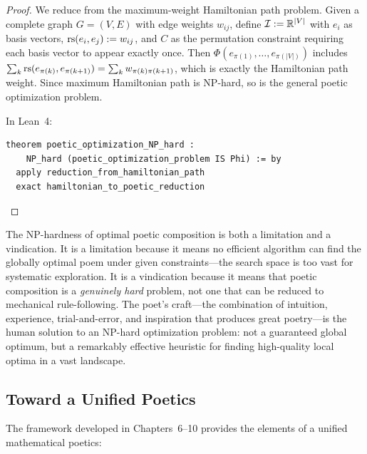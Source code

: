 \begin{proof}
We reduce from the maximum-weight Hamiltonian path problem.  Given a
complete graph $G = (V, E)$ with edge weights $w_{ij}$, define
$\mathcal{I} := \mathbb{R}^{|V|}$ with $e_i$ as basis vectors, $\mathrm{rs}(e_i, e_j) := w_{ij}$,
and $C$ as the permutation constraint requiring each basis vector to appear
exactly once.  Then $\Phi(e_{\pi(1)}, \ldots, e_{\pi(|V|)})$ includes
$\sum_{k} \mathrm{rs}(e_{\pi(k)}, e_{\pi(k+1)}) = \sum_k w_{\pi(k)\pi(k+1)}$,
which is exactly the Hamiltonian path weight.  Since maximum Hamiltonian path
is NP-hard, so is the general poetic optimization problem.

In Lean~4:
\begin{lstlisting}
theorem poetic_optimization_NP_hard :
    NP_hard (poetic_optimization_problem IS Phi) := by
  apply reduction_from_hamiltonian_path
  exact hamiltonian_to_poetic_reduction
\end{lstlisting}
\end{proof}

\begin{remark}
The NP-hardness of optimal poetic composition is both a limitation and a
vindication.  It is a limitation because it means no efficient algorithm can
find the globally optimal poem under given constraints---the search space is
too vast for systematic exploration.  It is a vindication because it means
that poetic composition is a \emph{genuinely hard} problem, not one that can
be reduced to mechanical rule-following.  The poet's craft---the combination
of intuition, experience, trial-and-error, and inspiration that produces great
poetry---is the human solution to an NP-hard optimization problem: not a
guaranteed global optimum, but a remarkably effective heuristic for finding
high-quality local optima in a vast landscape.
\end{remark}


\subsection{Toward a Unified Poetics}

The framework developed in Chapters~6--10 provides the elements of a unified
mathematical poetics:

